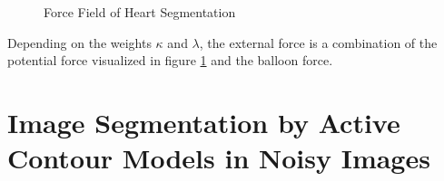 \begin{figure}[!hbt]
\centering   
{}
\caption{Force Field of Heart Segmentation}
\label{fig:ffhx}
\end{figure}

Depending on the weights $\kappa$ and $\lambda$, the external force is a combination of the potential force visualized in figure \ref{fig:ffhx} and the balloon force.


\section{Image Segmentation by Active Contour Models in Noisy Images}




